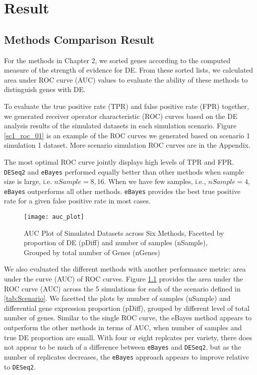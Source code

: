 \chapter{Result}

\section{Methods Comparison Result}

For the methods in Chapter 2, we sorted genes according to the computed measure of the strength of evidence for DE. From these sorted lists, we calculated area under ROC curve (AUC) values to evaluate the ability of these methods to distinguish genes with DE. 

To evaluate the true positive rate (TPR) and false positive rate (FPR) together, we generated receiver operator characteristic (ROC) curves based on the DE analysis results of the simulated datasets in each simulation scenario. Figure \ref{sc1_roc_01} is an example of the ROC curves we generated based on scenario 1 simulation 1 dataset. More scenario simulation ROC curves are in the Appendix. 

The most optimal ROC curve jointly displays high levels of TPR and FPR. {\tt DESeq2} and {\tt eBayes} performed equally better than other methods when sample size is large, i.e. $nSample = 8, 16$. When we have few samples, i.e., $nSample=4$, {\tt eBayes} outperforms all other methods. {\tt eBayes} provides the best true positive rate for a given false positive rate in most cases. 

\begin{figure}[h!tb] 
\texttt{[image: auc\_plot]}
\caption{AUC Plot of Simulated Datasets across Six Methods, Facetted by proportion of DE (pDiff) and number of samples (nSample), Grouped by total number of Genes (nGenes)}
\label{auc}
\end{figure}


We also evaluated the different methods with another performance metric: area under the curve (AUC) of ROC curves. Figure \ref{auc} provides the area under the ROC curve (AUC) across the 5 simulations for each of the scenario defined in \ref{tab:Scenario}. We facetted the plots by number of samples (nSample) and differential gene expression proportion (pDiff), grouped by different level of total number of genes. Similar to the single ROC curve, the eBayes method appears to outperform the other methods in terms of AUC, when number of samples and true DE proportion are small. With four or eight replcates per variety, there does not appear to be much of a difference between {\tt eBayes} and {\tt DESeq2}, but as the number of replicates decreases, the {\tt eBayes} approach appears to improve relative to {\tt DESeq2}.



